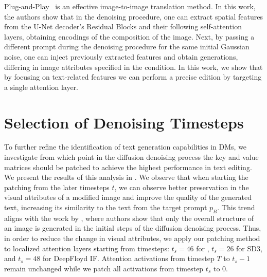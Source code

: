 Plug-and-Play~\citep{Tumanyan_2023_CVPR} is an effective image-to-image translation method. In this work, the authors show that in the denoising procedure, one can extract spatial features from the U-Net decoder's Residual Blocks and their following self-attention layers, obtaining encodings of the composition of the image. Next, by passing a different prompt during the denoising procedure for the same initial Gaussian noise, one can inject previously extracted features and obtain generations, differing in image attributes specified in the condition. In this work, we show that by focusing on text-related features we can perform a precise edition by targeting a single attention layer.

\section{Selection of Denoising Timesteps}



To further refine the identification of text generation capabilities in DMs, we investigate from which point in the diffusion denoising process the key and value matrices should be patched to achieve the highest performance in text editing.
We present the results of this analysis in . We observe that when starting the patching from the later timesteps $t$, we can observe better preservation in the visual attributes of a modified image and improve the quality of the generated text, increasing its similarity to the text from the target prompt $p_B$.
This trend aligns with the work by \cite{hertz2023prompttoprompt}, where authors show that only the overall structure of an image is generated in the initial steps of the diffusion denoising process. Thus, in order to reduce the change in visual attributes, we apply our patching method to localized attention layers starting from timesteps: $t_s=46$ for \SDXL, $t_s=26$ for SD3, and $t_s=48$ for DeepFloyd IF. Attention activations from timestep $T$ to $t_s-1$ remain unchanged while we patch all activations from timestep $t_s$ to $0$.


